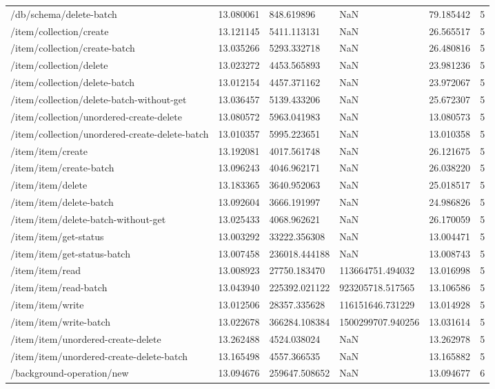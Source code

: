 \begin{tabularx}{\linewidth}{XXXXXX}
/db/schema/delete-batch & 13.080061 & 848.619896 & NaN & 79.185442 & 5 \\
/item/collection/create & 13.121145 & 5411.113131 & NaN & 26.565517 & 5 \\
/item/collection/create-batch & 13.035266 & 5293.332718 & NaN & 26.480816 & 5 \\
/item/collection/delete & 13.023272 & 4453.565893 & NaN & 23.981236 & 5 \\
/item/collection/delete-batch & 13.012154 & 4457.371162 & NaN & 23.972067 & 5 \\
/item/collection/delete-batch-without-get & 13.036457 & 5139.433206 & NaN & 25.672307 & 5 \\
/item/collection/unordered-create-delete & 13.080572 & 5963.041983 & NaN & 13.080573 & 5 \\
/item/collection/unordered-create-delete-batch & 13.010357 & 5995.223651 & NaN & 13.010358 & 5 \\
/item/item/create & 13.192081 & 4017.561748 & NaN & 26.121675 & 5 \\
/item/item/create-batch & 13.096243 & 4046.962171 & NaN & 26.038220 & 5 \\
/item/item/delete & 13.183365 & 3640.952063 & NaN & 25.018517 & 5 \\
/item/item/delete-batch & 13.092604 & 3666.191997 & NaN & 24.986826 & 5 \\
/item/item/delete-batch-without-get & 13.025433 & 4068.962621 & NaN & 26.170059 & 5 \\
/item/item/get-status & 13.003292 & 33222.356308 & NaN & 13.004471 & 5 \\
/item/item/get-status-batch & 13.007458 & 236018.444188 & NaN & 13.008743 & 5 \\
/item/item/read & 13.008923 & 27750.183470 & 113664751.494032 & 13.016998 & 5 \\
/item/item/read-batch & 13.043940 & 225392.021122 & 923205718.517565 & 13.106586 & 5 \\
/item/item/write & 13.012506 & 28357.335628 & 116151646.731229 & 13.014928 & 5 \\
/item/item/write-batch & 13.022678 & 366284.108384 & 1500299707.940256 & 13.031614 & 5 \\
/item/item/unordered-create-delete & 13.262488 & 4524.038024 & NaN & 13.262978 & 5 \\
/item/item/unordered-create-delete-batch & 13.165498 & 4557.366535 & NaN & 13.165882 & 5 \\
/background-operation/new & 13.094676 & 259647.508652 & NaN & 13.094677 & 6 \\

\end{tabularx}
